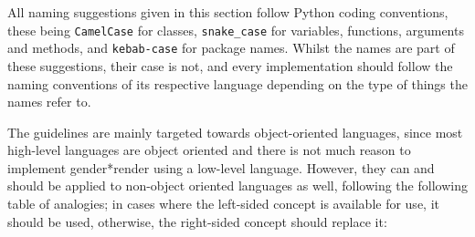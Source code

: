 \documentclass{article}
\newcommand{\GenderRender}{
    gender*render
}
\newcounter{subsubsubsection}[subsubsection]
\begin{document}
    All naming suggestions given in this section follow Python coding conventions, these being \texttt{CamelCase} for classes, \texttt{snake\_case} for variables, functions, arguments and methods, and \texttt{kebab-case} for package names.
    Whilst the names are part of these suggestions, their case is not, and every implementation should follow the naming conventions of its respective language depending on the type of things the names refer to.


    The guidelines are mainly targeted towards object-oriented languages, since most high-level languages are object oriented and there is not much reason to implement \GenderRender using a low-level language.
    However, they can and should be applied to non-object oriented languages as well, following the following table of analogies;
    in cases where the left-sided concept is available for use, it should be used, otherwise, the right-sided concept should replace it:
\end{document}
